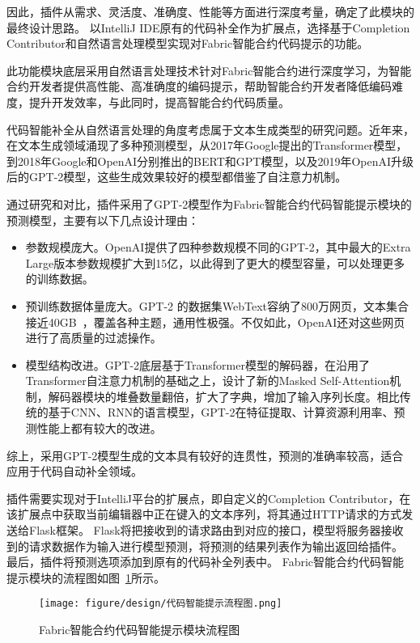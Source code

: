 因此，插件从需求、灵活度、准确度、性能等方面进行深度考量，确定了此模块的最终设计思路。
以IntelliJ IDE原有的代码补全作为扩展点，选择基于Completion Contributor和自然语言处理模型实现对Fabric智能合约代码提示的功能。

此功能模块底层采用自然语言处理技术针对Fabric智能合约进行深度学习，为智能合约开发者提供高性能、高准确度的编码提示，帮助智能合约开发者降低编码难度，提升开发效率，与此同时，提高智能合约代码质量。

代码智能补全从自然语言处理的角度考虑属于文本生成类型的研究问题。近年来，在文本生成领域涌现了多种预测模型，从2017年Google提出的Transformer模型，到2018年Google和OpenAI分别推出的BERT和GPT模型，以及2019年OpenAI升级后的GPT-2模型，这些生成效果较好的模型都借鉴了自注意力机制。

通过研究和对比，插件采用了GPT-2模型作为Fabric智能合约代码智能提示模块的预测模型，主要有以下几点设计理由：

\begin{itemize}
  \item 参数规模庞大。OpenAI提供了四种参数规模不同的GPT-2，其中最大的Extra Large版本参数规模扩大到15亿，以此得到了更大的模型容量，可以处理更多的训练数据。
  \item 预训练数据体量庞大。GPT-2 的数据集WebText容纳了800万网页，文本集合接近40GB~\cite{DBLP:conf/inlg/KoL20}，覆盖各种主题，通用性极强。不仅如此，OpenAI还对这些网页进行了高质量的过滤操作。
  \item 模型结构改进。GPT-2底层基于Transformer模型的解码器，在沿用了Transformer自注意力机制的基础之上，设计了新的Masked Self-Attention机制，解码器模块的堆叠数量翻倍，扩大了字典，增加了输入序列长度。相比传统的基于CNN、RNN的语言模型，GPT-2在特征提取、计算资源利用率、预测性能上都有较大的改进。
\end{itemize}

综上，采用GPT-2模型生成的文本具有较好的连贯性，预测的准确率较高，适合应用于代码自动补全领域。

插件需要实现对于IntelliJ平台的扩展点，即自定义的Completion Contributor，在该扩展点中获取当前编辑器中正在键入的文本序列，将其通过HTTP请求的方式发送给Flask框架。
Flask将把接收到的请求路由到对应的接口，模型将服务器接收到的请求数据作为输入进行模型预测，将预测的结果列表作为输出返回给插件。
最后，插件将预测选项添加到原有的代码补全列表中。
Fabric智能合约代码智能提示模块的流程图如图~\ref{fig:3.11}所示。

\begin{figure}[htb]
  \centering
  \texttt{[image: figure/design/代码智能提示流程图.png]}
  \caption{Fabric智能合约代码智能提示模块流程图}\label{fig:3.11}
\end{figure}

